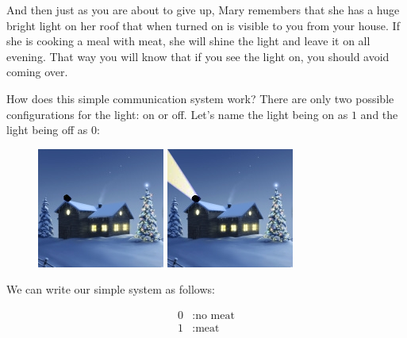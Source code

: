 \documentclass{book}
\begin{document}
And then just as you are about to give up, Mary remembers that she has a huge bright light on her roof that when turned on is visible to you from your house. If she is cooking a meal with meat, she will shine the light and leave it on all evening. That way you will know that if you see the light on, you should avoid coming over.

How does this simple communication system work? There are only two possible configurations for the light: on or off. Let's name the light being on as $1$ and the light being off as $0$:

\begin{figure}[H]
\centering
\begin{minipage}{.5\textwidth}
  \centering
  \includegraphics[width=.5\linewidth]{house_on_hill_0}
\end{minipage}%
\begin{minipage}{.5\textwidth}
  \centering
  \includegraphics[width=.5\linewidth]{house_on_hill_1}
\end{minipage}
\end{figure}

We can write our simple system as follows:

\begin{align*}
	0&: \text{no meat} \\
	1&: \text{meat}
\end{align*}
\end{document}
